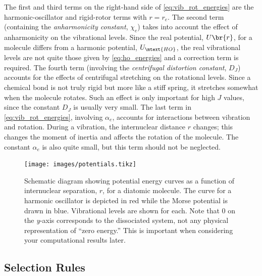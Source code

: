 The first and third terms on the right-hand side of \cref{eq:vib_rot_energies} are the harmonic-oscillator and rigid-rotor terms with \( r = r_e \).
The second term (containing the \emph{anharmonicity constant}, \( \chi_e \)) takes into account the effect of anharmonicity on the vibrational levels. 
Since the real potential, \( U\br{r} \), for a molecule differs from a harmonic potential, \( U_\mtext{HO} \), the real vibrational levels are not quite those given by \cref{eq:ho_energies} and a correction term is required. 
The fourth term (involving the \emph{centrifugal distortion constant}, \( D_J \)) accounts for the effects of centrifugal stretching on the rotational levels. 
Since a chemical bond is not truly rigid but more like a stiff spring, it stretches somewhat when the molecule rotates. 
Such an effect is only important for high \( J \) values, since the constant \( D_J \) is usually very small. 
The last term in \cref{eq:vib_rot_energies}, involving \( \alpha_e \), accounts for interactions between vibration and rotation. 
During a vibration, the internuclear distance \( r \) changes; this changes the moment of inertia and affects the rotation of the molecule. 
The constant \( \alpha_e \) is also quite small, but this term should not be neglected. 

\begin{figure}[tb]
  \centering
    \texttt{[image: images/potentials.tikz]}
  \caption{Schematic diagram showing potential energy curves as a function of internuclear separation, \( r \), for a diatomic molecule.
		The curve for a harmonic oscillator is depicted in red while the Morse potential is drawn in blue.
		Vibrational levels are shown for each.
    Note that \( 0 \) on the \emph{y}-axis corresponds to the dissociated system, not any physical representation of ``zero energy.''
    This is important when considering your computational results later. 
	}
  \label{fig:potential_curves}
\end{figure}

\subsection{Selection Rules} %
\label{sub:selection_rules}


